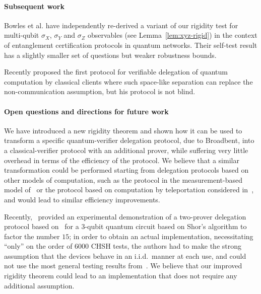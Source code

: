 \documentclass[11pt]{article}
\theoremstyle{remark}
\theoremstyle{definition}
\begin{document}
\paragraph{Subsequent work}
Bowles et al. \cite{BowlesSCA18}  have independently re-derived a
variant of our rigidity test for multi-qubit $\sigma_X$, $\sigma_Y$ and $\sigma_Z$ observables (see Lemma~\ref{lem:xyz-rigid}) in the context of entanglement certification protocols in
quantum networks.
Their self-test result has a slightly smaller set of questions but  weaker robustness
bounds.

Recently \cite{Grilo17} proposed the first protocol for verifiable
delegation of quantum computation by classical clients where such space-like
separation can replace the non-communication assumption, but his protocol is not
blind.

\paragraph{Open questions and directions for future work}
We have introduced a new rigidity theorem and shown how it can be used to transform a specific quantum-verifier delegation protocol, due to Broadbent, into a classical-verifier protocol with an additional prover, while suffering very little overhead in terms of the efficiency of the protocol. We believe that a similar transformation could be performed starting from delegation protocols based on other models of computation, such as the protocol in the measurement-based model of~\cite{fitzsimons12vubqc} or the protocol based on computation by teleportation considered in~\cite{reichardt2012classical}, and would lead to similar efficiency improvements. 

Recently,~\cite{experiment_ruv} provided an experimental demonstration of a two-prover delegation protocol based on~\cite{reichardt2012classical} for a $3$-qubit quantum circuit based on Shor's algorithm to factor the number $15$; in order to obtain an actual implementation, necessitating ``only'' on the order of $6000$ CHSH tests, the authors had to make the strong assumption that the devices behave in an i.i.d.\ manner at each use, and could not use the most general testing results from~\cite{reichardt2012classical}. We believe that our improved rigidity theorem could lead to an implementation that does not require any additional assumption. 
\end{document}

